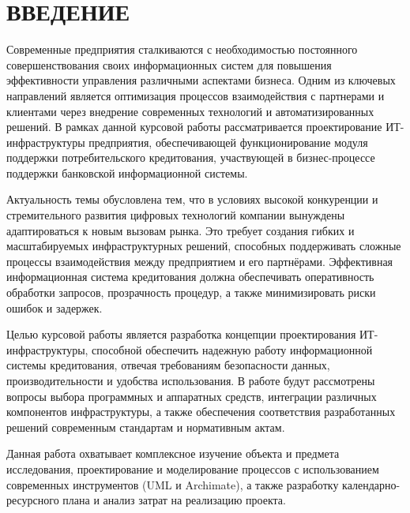 \documentclass[14pt, a4paper]{extarticle}
\begin{document}
\def\contentsname{СОДЕРЖАНИЕ}

%
%
\tableofcontents

\section*{ВВЕДЕНИЕ}

Современные предприятия сталкиваются с необходимостью постоянного
совершенствования своих информационных систем для повышения
эффективности управления различными аспектами бизнеса. Одним из
ключевых направлений является оптимизация процессов взаимодействия с
партнерами и клиентами через внедрение современных технологий и
автоматизированных решений. В рамках данной курсовой работы
рассматривается проектирование ИТ-инфраструктуры предприятия, 
обеспечивающей функционирование модуля поддержки потребительского 
кредитования, участвующей в бизнес-процессе поддержки банковской 
информационной системы.

Актуальность темы обусловлена тем, что в условиях высокой конкуренции
и стремительного развития цифровых технологий компании вынуждены
адаптироваться к новым вызовам рынка. Это требует создания гибких и
масштабируемых инфраструктурных решений, способных поддерживать
сложные процессы взаимодействия между предприятием и его
партнёрами. Эффективная информационная система кредитования
должна обеспечивать оперативность обработки запросов, прозрачность
процедур, а также минимизировать риски ошибок и задержек.

Целью курсовой работы является разработка концепции проектирования
ИТ-инфраструктуры, способной обеспечить надежную работу информационной
системы кредитования, отвечая требованиям безопасности данных,
производительности и удобства использования. В работе будут
рассмотрены вопросы выбора программных и аппаратных средств,
интеграции различных компонентов инфраструктуры, а также обеспечения
соответствия разработанных решений современным стандартам и
нормативным актам.

Данная работа охватывает комплексное изучение объекта и предмета
исследования, проектирование и моделирование процессов с
использованием современных инструментов (UML и Archimate), а также
разработку календарно-ресурсного плана и анализ затрат на реализацию
проекта.
\end{document}
